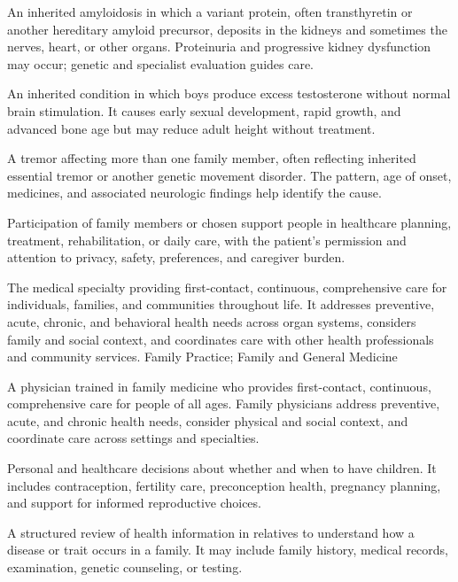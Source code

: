  An inherited amyloidosis in which a variant protein, often transthyretin or another hereditary amyloid precursor, deposits in the kidneys and sometimes the nerves, heart, or other organs. Proteinuria and progressive kidney dysfunction may occur; genetic and specialist evaluation guides care.

 An inherited condition in which boys produce excess testosterone without normal brain stimulation. It causes early sexual development, rapid growth, and advanced bone age but may reduce adult height without treatment.

 A tremor affecting more than one family member, often reflecting inherited essential tremor or another genetic movement disorder. The pattern, age of onset, medicines, and associated neurologic findings help identify the cause.

 Participation of family members or chosen support people in healthcare planning, treatment, rehabilitation, or daily care, with the patient’s permission and attention to privacy, safety, preferences, and caregiver burden.

 The medical specialty providing first-contact, continuous, comprehensive care for individuals, families, and communities throughout life.
It addresses preventive, acute, chronic, and behavioral health needs across
organ systems, considers family and social context, and coordinates care with
other health professionals and community services.
\synonyms
Family Practice; Family and General Medicine

 A physician trained in family medicine who provides first-contact, continuous,
comprehensive care for people of all ages. Family physicians address preventive, acute, and
chronic health needs, consider physical and social context, and coordinate care across
settings and specialties.

 Personal and healthcare decisions about whether and when to have children. It includes contraception, fertility care, preconception health, pregnancy planning, and support for informed reproductive choices.

 A structured review of health information in relatives to understand how a disease or trait occurs in a family. It may include family history, medical records, examination, genetic counseling, or testing.

